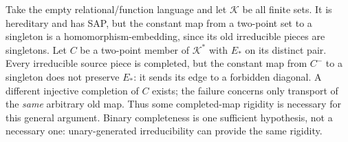 \begin{remark}
\label{rem:typed-universal-edge-old-completeness}
Take the empty relational/function language and let $\mathcal K$ be all
finite sets. It is hereditary and has SAP, but the constant map from a
two-point set to a singleton is a homomorphism-embedding, since its old
irreducible pieces are singletons. Let $C$ be a two-point member of
$\mathcal K^*$ with $E_*$ on its distinct pair. Every irreducible source
piece is completed, but the constant map from $C^-$ to a singleton does
not preserve $E_*$: it sends its edge to a forbidden diagonal.
A different injective completion of $C$ exists; the failure concerns only
transport of the \emph{same} arbitrary old map. Thus some completed-map
rigidity is necessary for this general argument. Binary completeness is
one sufficient hypothesis, not a necessary one: unary-generated
irreducibility can provide the same rigidity.
\end{remark}


